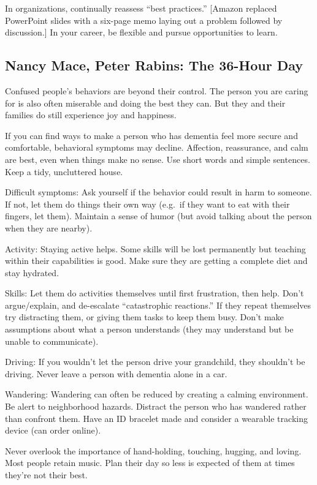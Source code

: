 \documentclass[
]{article}
\begin{document}
In organizations, continually reassess ``best practices.'' {[}Amazon
replaced PowerPoint slides with a six-page memo laying out a problem
followed by discussion.{]} In your career, be flexible and pursue
opportunities to learn.

\hypertarget{nancy-mace-peter-rabins-the-36-hour-day}{%
\subsection{Nancy Mace, Peter Rabins: The 36-Hour
Day}\label{nancy-mace-peter-rabins-the-36-hour-day}}

Confused people's behaviors are beyond their control. The person you are
caring for is also often miserable and doing the best they can. But they
and their families do still experience joy and happiness.

If you can find ways to make a person who has dementia feel more secure
and comfortable, behavioral symptoms may decline. Affection,
reassurance, and calm are best, even when things make no sense. Use
short words and simple sentences. Keep a tidy, uncluttered house.

Difficult symptoms: Ask yourself if the behavior could result in harm to
someone. If not, let them do things their own way (e.g.~if they want to
eat with their fingers, let them). Maintain a sense of humor (but avoid
talking about the person when they are nearby).

Activity: Staying active helps. Some skills will be lost permanently but
teaching within their capabilities is good. Make sure they are getting a
complete diet and stay hydrated.

Skills: Let them do activities themselves until first frustration, then
help. Don't argue/explain, and de-escalate ``catastrophic reactions.''
If they repeat themselves try distracting them, or giving them tasks to
keep them busy. Don't make assumptions about what a person understands
(they may understand but be unable to communicate).

Driving: If you wouldn't let the person drive your grandchild, they
shouldn't be driving. Never leave a person with dementia alone in a car.

Wandering: Wandering can often be reduced by creating a calming
environment. Be alert to neighborhood hazards. Distract the person who
has wandered rather than confront them. Have an ID bracelet made and
consider a wearable tracking device (can order online).

Never overlook the importance of hand-holding, touching, hugging, and
loving. Most people retain music. Plan their day so less is expected of
them at times they're not their best.
\end{document}
